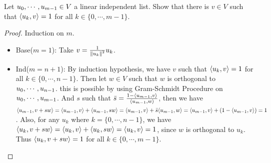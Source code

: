 \documentclass[../main.tex]{subfiles}
\begin{document}
\begin{exercise}
  Let $u_0 , \cdots , u_{m - 1} \in V$ a linear independent list. Show that
  there is $v \in V$ such that $\langle u_k , v\rangle = 1$ for all $k \in \{ 0, \cdots, m - 1 \}$.
\end{exercise}
\begin{proof}
  Induction on $m$.
  \begin{itemize}
    \item Base($m = 1$): Take $v = \frac{1}{\left\Vert u_k \right\Vert^2}u_k$.
    \item Ind($m = n + 1$): By induction hypothesis, we have $v$
          such that $\langle u_k , v\rangle = 1$ for all $k \in \{ 0, \cdots, n - 1 \}$.
          Then let $w \in V$ such that $w$ is orthogonal to $u_0 , \cdots , u_{n - 1}$.
          this is possible by using Gram-Schmidt Procedure on $u_0 , \cdots , u_{m - 1}$.
          And $s$ such that $\bar{s} = \frac{1 - \langle u_{m - 1} , v\rangle}{\langle u_{m - 1} , w\rangle}$,
          then we have
          $\langle u_{m - 1} , v + sw\rangle = \langle u_{m - 1} , v\rangle + \langle u_{m - 1} , sw\rangle = \langle u_{m - 1} , v\rangle + \bar{s}\langle u_{m - 1} , w\rangle = \langle u_{m - 1} , v\rangle + (1 - \langle u_{m - 1} , v\rangle) = 1$.
          Also, for any $u_k$ where $k = \{ 0, \cdots, n - 1 \}$, we have $\langle u_k , v + sw\rangle = \langle u_k , v\rangle + \langle u_k , sw\rangle = \langle u_k , v\rangle = 1$,
          since $w$ is orthogonal to $u_k$.
          Thus $\langle u_k , v + sw\rangle = 1$ for all $k \in \{ 0, \cdots, m - 1 \}$.
  \end{itemize}
\end{proof}
\end{document}
